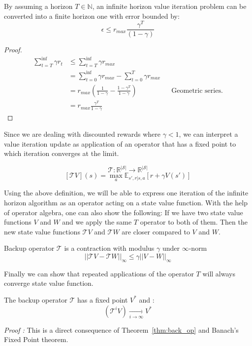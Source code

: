 \documentclass{article}
\begin{document}
\begin{thm}
By assuming a horizon $T \in \mathbb{N}$, an infinite horizon value iteration problem can be converted into a finite horizon one with error bounded by:
\[
\epsilon \leq r_{max}\frac{\gamma^{T}}{(1-\gamma)}
\]
\end{thm}

\begin{proof}
\begin{align*}
\sum_{t=T}^{\inf} \gamma r_t &\leq \sum_{t=T}^{\inf} \gamma r_{max} &&\\
&= \sum_{t=0}^{\inf} \gamma r_{max} - \sum_{t=0}^{T} \gamma r_{max} &&\\
&= r_{max} \left( \frac{1}{1-\gamma} - \frac{1-\gamma^T}{1-\gamma} \right) &&\text{Geometric series.}\\
&= r_{max} \frac{\gamma^T}{1-\gamma} &&
\end{align*}
\end{proof}

Since we are dealing with discounted rewards where $\gamma < 1$, we can interpret a value iteration update as application of an operator that has a fixed point to which iteration converges at the limit.

\begin{defn}
\[
\mathcal{T} : \mathbb{R}^{|\mathcal{S}|}\rightarrow\mathbb{R}^{|\mathcal{S}|}
\]
\[
[\mathcal{T}V](s) = \max_{a}\mathbb{E}_{s',r|s,a}[r + \gamma V(s')]
\]
\end{defn}
Using the above definition, we will be able to express one iteration of the infinite horizon algorithm as an operator acting on a state value function. With the help of operator algebra, one can also show the following: If we have two state value functions $V$ and $W$ and we apply the same $T$ operator to both of them. Then the new state value functions $\mathcal{T}V$ and $\mathcal{T}W$ are closer compared to $V$ and $W$. 
\begin{thm}
Backup operator $\mathcal{T}$ is a contraction with modulus $\gamma$ under $\infty$-norm
\[
||\mathcal{T}V-\mathcal{T}W||_{\infty}\leq \gamma||V-W||_\infty
\]
\label{thm:back_op}
\end{thm}
Finally we can show that repeated applications of the operator $T$ will always converge state value function.  
\begin{thm}
The backup operator $\mathcal{T}$ has a fixed point $V^{*}$ and :
\[
(\mathcal{T}^{i}V)\underset{i\rightarrow\infty}{\rightarrow} V^{*}
\]
\end{thm}
\textit{Proof :} This is a direct consequence of Theorem~\ref{thm:back_op} and Banach's Fixed Point theorem.\\
\end{document}

